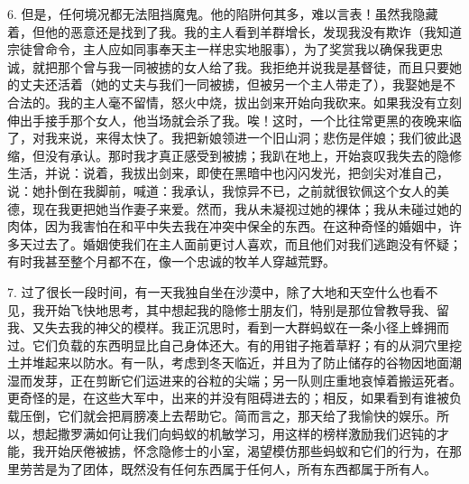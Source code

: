 6. 但是，任何境况都无法阻挡魔鬼。他的陷阱何其多，难以言表！虽然我隐藏着，但他的恶意还是找到了我。我的主人看到羊群增长，发现我没有欺诈（我知道宗徒曾命令，主人应如同事奉天主一样忠实地服事），为了奖赏我以确保我更忠诚，就把那个曾与我一同被掳的女人给了我。我拒绝并说我是基督徒，而且只要她的丈夫还活着（她的丈夫与我们一同被掳，但被另一个主人带走了），我娶她是不合法的。我的主人毫不留情，怒火中烧，拔出剑来开始向我砍来。如果我没有立刻伸出手接手那个女人，他当场就会杀了我。唉！这时，一个比往常更黑的夜晚来临了，对我来说，来得太快了。我把新娘领进一个旧山洞；悲伤是伴娘；我们彼此退缩，但没有承认。那时我才真正感受到被掳；我趴在地上，开始哀叹我失去的隐修生活，并说：说着，我拔出剑来，即使在黑暗中也闪闪发光，把剑尖对准自己，说：她扑倒在我脚前，喊道：我承认，我惊异不已，之前就很钦佩这个女人的美德，现在我更把她当作妻子来爱。然而，我从未凝视过她的裸体；我从未碰过她的肉体，因为我害怕在和平中失去我在冲突中保全的东西。在这种奇怪的婚姻中，许多天过去了。婚姻使我们在主人面前更讨人喜欢，而且他们对我们逃跑没有怀疑；有时我甚至整个月都不在，像一个忠诚的牧羊人穿越荒野。\par

7. 过了很长一段时间，有一天我独自坐在沙漠中，除了大地和天空什么也看不见，我开始飞快地思考，其中想起我的隐修士朋友们，特别是那位曾教导我、留我、又失去我的神父的模样。我正沉思时，看到一大群蚂蚁在一条小径上蜂拥而过。它们负载的东西明显比自己身体还大。有的用钳子拖着草籽；有的从洞穴里挖土并堆起来以防水。有一队，考虑到冬天临近，并且为了防止储存的谷物因地面潮湿而发芽，正在剪断它们运进来的谷粒的尖端；另一队则庄重地哀悼着搬运死者。更奇怪的是，在这些大军中，出来的并没有阻碍进去的；相反，如果看到有谁被负载压倒，它们就会把肩膀凑上去帮助它。简而言之，那天给了我愉快的娱乐。所以，想起撒罗满如何让我们向蚂蚁的机敏学习，用这样的榜样激励我们迟钝的才能，我开始厌倦被掳，怀念隐修士的小室，渴望模仿那些蚂蚁和它们的行为，在那里劳苦是为了团体，既然没有任何东西属于任何人，所有东西都属于所有人。\par

